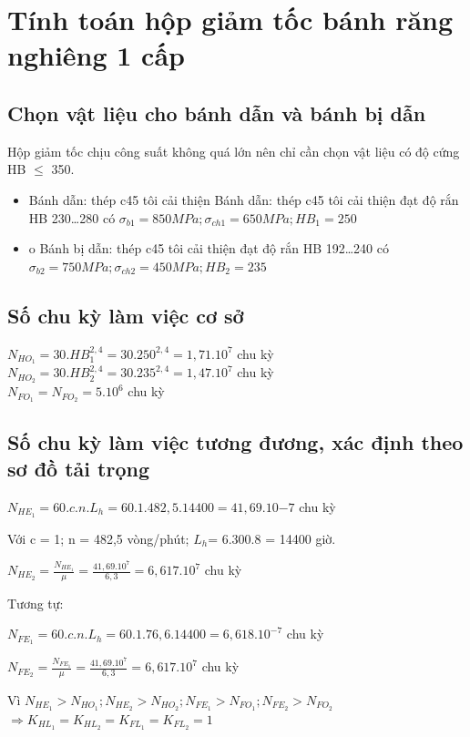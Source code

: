 \section{Tính toán hộp giảm tốc bánh răng nghiêng 1 cấp}
\subsection{Chọn vật liệu cho bánh dẫn và bánh bị dẫn}
Hộp giảm tốc chịu công suất không quá lớn nên chỉ cần chọn vật liệu có độ cứng HB $\leq$ 350.
\begin{itemize}
    \item Bánh dẫn: thép c45 tôi cải thiện 	Bánh dẫn: thép c45 tôi cải thiện đạt độ rắn HB 230…280 có $\sigma_{b1} = 850MPa; \sigma_{ch1} = 650MPa; HB_1 = 250$
    \item o	Bánh bị dẫn: thép c45 tôi cải thiện đạt độ rắn HB 192…240 có $\sigma_{b2} = 750MPa; \sigma_{ch2} = 450MPa; HB_2 = 235$
\end{itemize}
\subsection{Số chu kỳ làm việc cơ sở}
\begin{center}
        $N_{HO_1} = 30.HB_1^{2,4} = 30.250^{2,4} = 1,71.10^7$ chu kỳ \\
        $N_{HO_2} = 30.HB_2^{2,4} = 30.235^{2,4} = 1,47.10^7$ chu kỳ \\
        $N_{FO_1} = N_{FO_2} = 5.10^6$ chu kỳ \\
\end{center}
\subsection{Số chu kỳ làm việc tương đương, xác định theo sơ đồ tải trọng}
\begin{center}
    $N_{HE_1} = 60.c.n.L_h = 60.1.482,5.14400 = 41,69.10{-7}$ chu kỳ
\end{center}
Với c = 1; n = 482,5 vòng/phút; $L_h$= 6.300.8 = 14400 giờ. 
\begin{center}
    $N_{HE_2} = \frac{N_{HE_1}}{\mu} = \frac{41,69.10^7}{6,3} = 6,617.10^7$ chu kỳ
\end{center}
Tương tự:
\begin{center}
    $N_{FE_1} = 60.c.n.L_h = 60.1.76,6.14400 = 6,618.10^{-7}$ chu kỳ
\end{center}
\begin{center}
    $N_{FE_2} = \frac{N_{FE_1}}{\mu} = \frac{41,69.10^7}{6,3} = 6,617.10^7$ chu kỳ
\end{center} 
Vì $N_{HE_1} > N_{HO_1}; N_{HE_2} > N_{HO_2}; N_{FE_1} > N_{FO_1}; N_{FE_2} > N_{FO_2}$ \\
$\Rightarrow K_{HL_1} = K_{HL_2} = K_{FL_1} = K_{FL_2} = 1$
